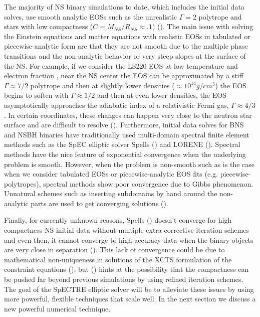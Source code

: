  The majority of NS binary simulations to date, which includes the initial data solves, use smooth analytic EOSs such as the unrealistic $\Gamma = 2$ polytrope and stars with low compactness ($C = M_{NS}/R_{NS} \approx .1$) (\cite{faber2012binary}). The main issue with solving the Einstein equations and matter equations with realistic EOSs in tabulated or piecewise-analytic form are that they are not smooth due to the multiple phase transitions and the non-analytic behavior or very steep slopes at the surface of the NS. For example, if we consider the LS220 EOS at low temperature and electron fraction \cite{lattimer1991generalized}, near the NS center the EOS can be approximated by a stiff $\Gamma \approx 7/2$ polytrope and then at slightly lower densities ($\approx 10^{14} g/cm^{3}$) the EOS begins to soften with $\Gamma \approx 1/2$ and then at even lower densities, the EOS asymptotically approaches the adiabatic index of a relativistic Fermi gas, $\Gamma \approx 4/3$. In certain coordinates, these changes can happen very close to the neutron star surface and are difficult to resolve (\cite{deaton2013black}). Furthermore, initial data solves for BNS and NSBH binaries have traditionally used multi-domain spectral finite element methods such as the SpEC elliptic solver Spells (\cite{pfeiffer2003multidomain}) and LORENE (\cite{gourgoulhon2001quasiequilibrium}). Spectral methods have the nice feature of exponential convergence when the underlying problem is smooth. However, when the problem is non-smooth such as is the case when we consider tabulated EOSs or piecewise-analytic EOS fits (e.g. piecewise-polytropes), spectral methods show poor convergence due to Gibbs phenomenon. Unnatural schemes such as inserting subdomains by hand around the non-analytic parts are used to get converging solutions (\cite{deaton2013black}). 

Finally, for currently unknown reasons, Spells (\cite{pfeiffer2003multidomain}) doesn't converge for high compactness NS initial-data without multiple extra corrective iteration schemes and even then, it cannot converge to high accuracy data when the binary objects are very close in separation (\cite{henriksson2014initial}). This lack of convergence could be due to mathematical non-uniqueness in solutions of the XCTS formulation of the constraint equations (\cite{cordero2009improved}), but (\cite{henriksson2014initial}) hints at the possibility that the compactness can be pushed far beyond previous simulations by using refined iteration schemes. The goal of the SpECTRE elliptic solver will be to alleviate these issues by using more powerful, flexible techniques that scale well. In the next section we discuss a new powerful numerical technique.


